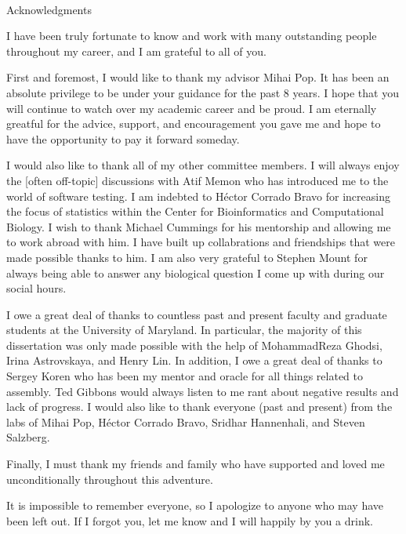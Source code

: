 
\renewcommand{\baselinestretch}{2}
\small\normalsize
\hbox{\ }

\vspace{-.65in}

\begin{center}
\large{Acknowledgments}
\end{center}

\vspace{1ex}

I have been truly fortunate to know and work with many outstanding people throughout my career, and I am grateful to all of you.

First and foremost, I would like to thank my advisor Mihai Pop.
It has been an absolute privilege to be under your guidance for the past 8 years.
I hope that you will continue to watch over my academic career and be proud.
I am eternally greatful for the advice, support, and encouragement you gave me and hope to have the opportunity to pay it forward someday.

I would also like to thank all of my other committee members. I will always enjoy the [often off-topic] discussions with Atif Memon who has introduced me to the world of software testing.
I am indebted to H\'{e}ctor Corrado Bravo for increasing the focus of statistics within the Center for Bioinformatics and Computational Biology.
I wish to thank Michael Cummings for his mentorship and allowing me to work abroad with him.
I have built up collabrations and friendships that were made possible thanks to him.
I am also very grateful to Stephen Mount for always being able to answer any biological question I come up with during our social hours.

I owe a great deal of thanks to countless past and present faculty and graduate students at the University of Maryland.
In particular, the majority of this dissertation was only made possible with the help of MohammadReza Ghodsi, Irina Astrovskaya, and Henry Lin.
In addition, I owe a great deal of thanks to Sergey Koren who has been my mentor and oracle for all things related to assembly.
Ted Gibbons would always listen to me rant about negative results and lack of progress.
I would also like to thank everyone (past and present) from the labs of Mihai Pop, H\'{e}ctor Corrado Bravo, Sridhar Hannenhali, and Steven Salzberg.

Finally, I must thank my friends and family who have supported and loved me unconditionally throughout this adventure.

It is impossible to remember everyone, so I apologize to anyone who may have been left out. If I forgot you, let me know and I will happily by you a drink.
